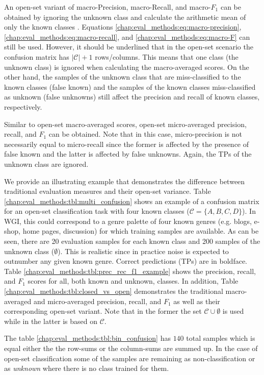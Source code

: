 An open-set variant of macro-Precision, macro-Recall, and macro-$F_{1}$ can be obtained by ignoring the unknown class and calculate the arithmetic mean of only the known classes \parencite{mendesjunior2016}. Equations \ref{chap:eval_methods:eq:macro-precision}, \ref{chap:eval_methods:eq:macro-recall}, and \ref{chap:eval_methods:eq:macro-F} can still be used. However, it should be underlined that in the open-set scenario the confusion matrix has $|\mathcal{C}|+1$ rows/columns. This means that one class (the unknown class) is ignored when calculating the macro-averaged scores. On the other hand, the samples of the unknown class that are miss-classified to the known classes (false known) and the samples of the known classes miss-classified as unknown (false unknowns) still affect the precision and recall of known classes, respectively. 

Similar to open-set macro-averaged scores, open-set micro-averaged precision, recall, and $F_{1}$ can be obtained. Note that in this case, micro-precision is not necessarily equal to micro-recall since the former is affected by the presence of false known and the latter is affected by false unknowns. Again, the TPs of the unknown class are ignored. 

We provide an illustrating example that demonstrates the difference between traditional evaluation measures and their open-set variance. Table \ref{chap:eval_methods:tbl:multi_confusion} shows an example of a confusion matrix for an open-set classification task with four known classes ($\mathcal{C}=\{A,B,C,D\}$). In WGI, this could correspond to a genre palette of four known genres (e.g. blogs, e-shop, home pages, discussion) for which training samples are available. As can be seen, there are 20 evaluation samples for each known class and 200 samples of the unknown class ($\emptyset$). This is realistic since in practice noise is expected to outnumber any given known genre. Correct predictions (TPs) are in boldface. Table \ref{chap:eval_methods:tbl:prec_rec_f1_example} shows the precision, recall, and $F_{1}$ scores for all, both known and unknown, classes. In addition, Table \ref{chap:eval_methods:tbl:closed_vs_open} demonstrates the traditional macro-averaged and micro-averaged precision, recall, and $F_{1}$ as well as their corresponding open-set variant. Note that in the former the set $\mathcal{C} \cup \emptyset$ is used while in the latter is based on $\mathcal{C}$. 

The table \ref{chap:eval_methods:tbl:bin_confusion} has $140$ total samples which is equal either the the row-sums or the column-sums are summed up. In the case of open-set classification some of the samples are remaining as non-classification or as \textit{unknown} where there is no class trained for them. 

